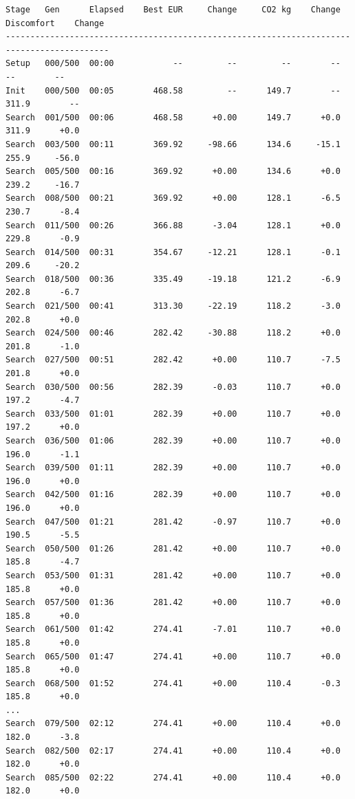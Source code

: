 \begin{tcolorbox}[
  breakable,
  enhanced,
  colback=termbg,
  colframe=termborder,
  colupper=termfg,
  before upper=\singlespacing,
  arc=5pt,
  boxrule=0.8pt,
  left=6pt, right=6pt, top=1pt, bottom=6pt
]
\begin{lstlisting}[style=terminalstyle]
Stage   Gen      Elapsed    Best EUR     Change     CO2 kg    Change   Discomfort    Change
-------------------------------------------------------------------------------------------
Setup   000/500  00:00            --         --         --        --           --        --
Init    000/500  00:05        468.58         --      149.7        --        311.9        --
Search  001/500  00:06        468.58      +0.00      149.7      +0.0        311.9      +0.0
Search  003/500  00:11        369.92     -98.66      134.6     -15.1        255.9     -56.0
Search  005/500  00:16        369.92      +0.00      134.6      +0.0        239.2     -16.7
Search  008/500  00:21        369.92      +0.00      128.1      -6.5        230.7      -8.4
Search  011/500  00:26        366.88      -3.04      128.1      +0.0        229.8      -0.9
Search  014/500  00:31        354.67     -12.21      128.1      -0.1        209.6     -20.2
Search  018/500  00:36        335.49     -19.18      121.2      -6.9        202.8      -6.7
Search  021/500  00:41        313.30     -22.19      118.2      -3.0        202.8      +0.0
Search  024/500  00:46        282.42     -30.88      118.2      +0.0        201.8      -1.0
Search  027/500  00:51        282.42      +0.00      110.7      -7.5        201.8      +0.0
Search  030/500  00:56        282.39      -0.03      110.7      +0.0        197.2      -4.7
Search  033/500  01:01        282.39      +0.00      110.7      +0.0        197.2      +0.0
Search  036/500  01:06        282.39      +0.00      110.7      +0.0        196.0      -1.1
Search  039/500  01:11        282.39      +0.00      110.7      +0.0        196.0      +0.0
Search  042/500  01:16        282.39      +0.00      110.7      +0.0        196.0      +0.0
Search  047/500  01:21        281.42      -0.97      110.7      +0.0        190.5      -5.5
Search  050/500  01:26        281.42      +0.00      110.7      +0.0        185.8      -4.7
Search  053/500  01:31        281.42      +0.00      110.7      +0.0        185.8      +0.0
Search  057/500  01:36        281.42      +0.00      110.7      +0.0        185.8      +0.0
Search  061/500  01:42        274.41      -7.01      110.7      +0.0        185.8      +0.0
Search  065/500  01:47        274.41      +0.00      110.7      +0.0        185.8      +0.0
Search  068/500  01:52        274.41      +0.00      110.4      -0.3        185.8      +0.0
...
Search  079/500  02:12        274.41      +0.00      110.4      +0.0        182.0      -3.8
Search  082/500  02:17        274.41      +0.00      110.4      +0.0        182.0      +0.0
Search  085/500  02:22        274.41      +0.00      110.4      +0.0        182.0      +0.0

\end{lstlisting}
\end{tcolorbox}
